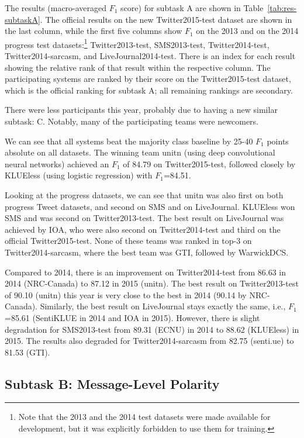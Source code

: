 \documentclass[11pt]{article}
\begin{document}
The results (macro-averaged $F_1$ score) for subtask A are shown in Table~\ref{tab:res-subtaskA}.
The official results on the new Twitter2015-test dataset are shown in the last column,
while the first five columns show $F_1$ on the 2013 and on the 2014 progress test
datasets:\footnote{Note that the 2013 and the 2014 test datasets were made available for development, but it was explicitly forbidden to use them for training.}
Twitter2013-test, SMS2013-test, Twitter2014-test, Twitter2014-sarcasm, and LiveJournal2014-test.
There is an index for each result showing the relative rank of that result within the respective column. The participating systems are ranked by their score on the Twitter2015-test dataset, which is the official ranking for subtask A; all remaining rankings are secondary.

There were less participants this year,
probably due to having a new similar subtask: C.
Notably, many of the participating teams were newcomers.

We can see that all systems beat the majority class baseline by 25-40
$F_1$ points absolute on all datasets.
The winning team unitn (using deep convolutional neural networks)
achieved an $F_1$ of 84.79 on Twitter2015-test,
followed closely by KLUEless (using logistic regression) with $F_1$=84.51.

Looking at the progress datasets, we can see that
unitn was also first on both progress Tweet datasets,
and second on SMS and on LiveJournal.
KLUEless won SMS and was second on Twitter2013-test.
The best result on LiveJournal was achieved by IOA, 
who were also second on Twitter2014-test and third on the official Twitter2015-test.
None of these teams was ranked in top-3 on Twitter2014-sarcasm,
where the best team was GTI, followed by WarwickDCS.

Compared to 2014, there is an improvement on Twitter2014-test
from 86.63 in 2014 (NRC-Canada) to 87.12 in 2015 (unitn).
The best result on Twitter2013-test of 90.10 (unitn) this year
is very close to the best in 2014 (90.14 by NRC-Canada).
Similarly, the best result on LiveJournal stays exactly the same,
i.e., $F_1$=85.61 (SentiKLUE in 2014 and IOA in 2015).
However, there is slight degradation for SMS2013-test
from 89.31 (ECNU) in 2014 to 88.62 (KLUEless) in 2015.
The results also degraded for Twitter2014-sarcasm
from 82.75 (senti.ue) to 81.53 (GTI).


\subsection{Subtask B: Message-Level Polarity}
\end{document}
